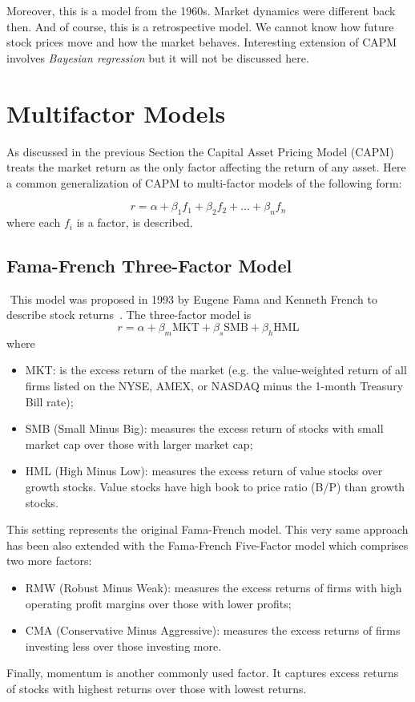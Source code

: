 Moreover, this is a model from the 1960s. Market dynamics were different back then. And of course, this is a retrospective model. We cannot know how future stock prices move and how the market behaves.
Interesting extension of CAPM involves \emph{Bayesian regression}\cite{bib:bayesian_regression} but it will not be discussed here.

\section{Multifactor Models}
As discussed in the previous Section the Capital Asset Pricing Model (CAPM) treats the market return as the only factor affecting the return of any asset. Here a common generalization of CAPM to multi-factor models of the following form:

\begin{equation}
r=\alpha + \beta_1 f_1 + \beta_2 f_2 +\ldots + \beta_n f_n
\end{equation}
where each $f_i$ is a factor, is described.

\subsection{Fama-French Three-Factor Model}
﻿
This model was proposed in 1993 by Eugene Fama and Kenneth French to describe stock returns~\cite{bib:fama_french}. The three-factor model is
\begin{equation}
r=\alpha + \beta_m \textrm{MKT} +\beta_s \textrm{SMB}+ \beta_h \textrm{HML}
\end{equation}
where
\begin{itemize}
\tightlist
\item MKT: is the excess return of the market (e.g. the value-weighted return of all firms listed on the NYSE, AMEX, or NASDAQ minus the 1-month Treasury Bill rate);
\item SMB (Small Minus Big): measures the excess return of stocks with small market cap over those with larger market cap;
\item HML (High Minus Low): measures the excess return of value stocks over growth stocks. Value stocks have high book to price ratio (B/P) than growth stocks.
\end{itemize}

This setting represents the original Fama-French model. This very same approach has been also extended with the Fama-French Five-Factor model which comprises two more factors:
\begin{itemize}
	\tightlist
\item RMW (Robust Minus Weak): measures the excess returns of firms with high operating profit margins over those with lower profits;
\item CMA (Conservative Minus Aggressive): measures the excess returns of firms investing less over those investing more.
\end{itemize}
Finally, momentum is another commonly used factor. It captures excess returns of stocks with highest returns over those with lowest returns.

